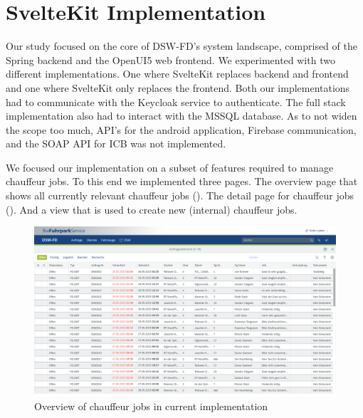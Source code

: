 \section{SvelteKit Implementation}


Our study focused on the core of DSW-FD's system landscape, comprised of the Spring backend and the OpenUI5 web frontend. We experimented with two different implementations. One where SvelteKit replaces backend and frontend and one where SvelteKit only replaces the frontend. Both our implementations had to communicate with the Keycloak service to authenticate. The full stack implementation also had to interact with the MSSQL database. As to not widen the scope too much, API's for the android application, Firebase communication, and the SOAP API for ICB was not implemented.

We focused our implementation on a subset of features required to manage chauffeur jobs. To this end we implemented three pages. The overview page that shows all currently relevant chauffeur jobs (). The detail page for chauffeur jobs (). And a view that is used to create new (internal) chauffeur jobs.

\begin{figure}
    \centering
    \includegraphics[width=\linewidth]{assets/current-auftrag-overview}
    \caption{Overview of chauffeur jobs in current implementation}
    \label{fig:current-overview-auftrag}
\end{figure}

